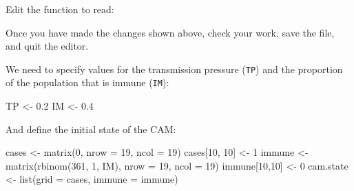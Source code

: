 \documentclass[
  12pt,
  a4paper]{book}
\newenvironment{Shaded}{\begin{snugshade}}{\end{snugshade}}
\newcommand{\AttributeTok}[1]{\textcolor[rgb]{0.77,0.63,0.00}{#1}}
\newcommand{\ControlFlowTok}[1]{\textcolor[rgb]{0.13,0.29,0.53}{\textbf{#1}}}
\newcommand{\DecValTok}[1]{\textcolor[rgb]{0.00,0.00,0.81}{#1}}
\newcommand{\FloatTok}[1]{\textcolor[rgb]{0.00,0.00,0.81}{#1}}
\newcommand{\FunctionTok}[1]{\textcolor[rgb]{0.00,0.00,0.00}{#1}}
\newcommand{\NormalTok}[1]{#1}
\newcommand{\OtherTok}[1]{\textcolor[rgb]{0.56,0.35,0.01}{#1}}
\newcommand{\SpecialCharTok}[1]{\textcolor[rgb]{0.00,0.00,0.00}{#1}}
\begin{document}
Edit the function to read:

\begin{Shaded}
\end{Shaded}

Once you have made the changes shown above, check your work, save the file, and quit the editor.

We need to specify values for the transmission pressure (\texttt{TP}) and the proportion of the population that is immune (\texttt{IM}):

\begin{Shaded}
\begin{Highlighting}[]
\NormalTok{TP }\OtherTok{\textless{}{-}} \FloatTok{0.2}
\NormalTok{IM }\OtherTok{\textless{}{-}} \FloatTok{0.4}
\end{Highlighting}
\end{Shaded}

And define the initial state of the CAM:

\begin{Shaded}
\begin{Highlighting}[]
\NormalTok{cases }\OtherTok{\textless{}{-}} \FunctionTok{matrix}\NormalTok{(}\DecValTok{0}\NormalTok{, }\AttributeTok{nrow =} \DecValTok{19}\NormalTok{, }\AttributeTok{ncol =} \DecValTok{19}\NormalTok{)}
\NormalTok{cases[}\DecValTok{10}\NormalTok{, }\DecValTok{10}\NormalTok{] }\OtherTok{\textless{}{-}} \DecValTok{1}
\NormalTok{immune }\OtherTok{\textless{}{-}} \FunctionTok{matrix}\NormalTok{(}\FunctionTok{rbinom}\NormalTok{(}\DecValTok{361}\NormalTok{, }\DecValTok{1}\NormalTok{, IM), }\AttributeTok{nrow =} \DecValTok{19}\NormalTok{, }\AttributeTok{ncol =} \DecValTok{19}\NormalTok{)}
\NormalTok{immune[}\DecValTok{10}\NormalTok{,}\DecValTok{10}\NormalTok{] }\OtherTok{\textless{}{-}} \DecValTok{0}
\NormalTok{cam.state }\OtherTok{\textless{}{-}} \FunctionTok{list}\NormalTok{(}\AttributeTok{grid =}\NormalTok{ cases, }\AttributeTok{immune =}\NormalTok{ immune)}
\end{Highlighting}
\end{Shaded}
\end{document}
